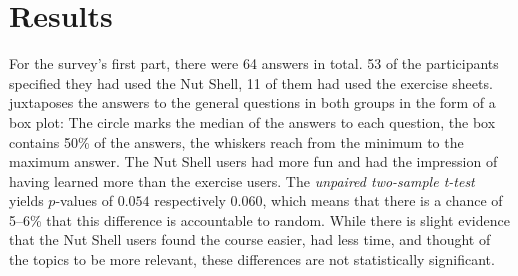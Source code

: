 \documentclass[paper=a4,twoside,abstract=on,cleardoublepage=empty,numbers=noenddot,toc=bib,12pt,appendixprefix=true]{scrreprt}
\begin{document}
\section{Results}

For the survey's first part, there were 64 answers in total. 53 of the participants specified they had used the Nut Shell, 11 of them had used the exercise sheets.  juxtaposes the answers to the general questions in both groups in the form of a box plot: The circle marks the median of the answers to each question, the box contains 50\% of the answers, the whiskers reach from the minimum to the maximum answer. The Nut Shell users had more fun and had the impression of having learned more than the exercise users. The \emph{unpaired two-sample t-test} \cite{student08} yields $p$-values of $0.054$ respectively $0.060$, which means that there is a chance of 5--6\% that this difference is accountable to random. While there is slight evidence that the Nut Shell users found the course easier, had less time, and thought of the topics to be more relevant, these differences are not statistically significant.
\end{document}

